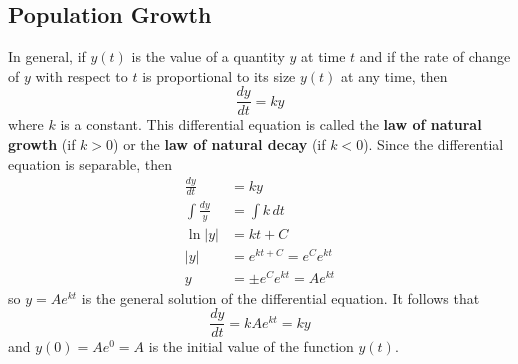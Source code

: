\subsection{Population Growth}
In general, if \(y(t)\) is the value of a quantity \(y\) at time \(t\) and if
the rate of change of \(y\) with respect to \(t\) is proportional to its size
\(y(t)\) at any time, then
\[\frac{dy}{dt}=ky\]
where \(k\) is a constant.
This differential equation is called the \textbf{law of natural growth}
(if \(k>0\)) or the \textbf{law of natural decay} (if \(k<0\)).
Since the differential equation is separable, then
\begin{align*}
    \frac{dy}{dt} &= ky \\
    \int\frac{dy}{y} &= \int k\,dt \\
    \ln|y| &= kt+C \\
    |y| &= e^{kt+C}=e^Ce^{kt} \\
    y &= \pm e^Ce^{kt}=Ae^{kt}
\end{align*}
so \(y=Ae^{kt}\) is the general solution of the differential equation.
It follows that
\[\frac{dy}{dt}=kAe^{kt}=ky\]
and \(y(0)=Ae^0=A\) is the initial value of the function \(y(t)\).

